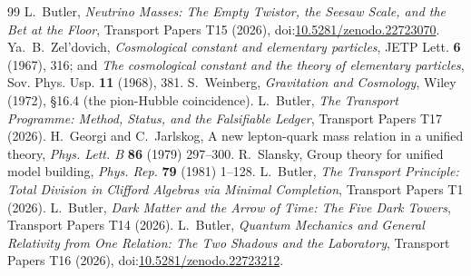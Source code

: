 \documentclass[11pt]{article}
\theoremstyle{definition}
\theoremstyle{plain}
\begin{document}
\begin{thebibliography}{99}
 L.~Butler,
\emph{Neutrino Masses: The Empty Twistor, the Seesaw Scale, and the Bet at the Floor},
Transport Papers T15 (2026), doi:\href{https://doi.org/10.5281/zenodo.22723070}{10.5281/zenodo.22723070}.
 Ya.~B.~Zel'dovich,
\emph{Cosmological constant and elementary particles},
JETP Lett. \textbf{6} (1967), 316; and \emph{The cosmological constant and the theory of elementary particles}, Sov. Phys. Usp. \textbf{11} (1968), 381.
 S.~Weinberg,
\emph{Gravitation and Cosmology},
Wiley (1972), \S16.4 (the pion-Hubble coincidence).
 L.~Butler,
\emph{The Transport Programme: Method, Status, and the Falsifiable Ledger},
Transport Papers T17 (2026).
 H.~Georgi and C.~Jarlskog,
A new lepton-quark mass relation in a unified theory,
\emph{Phys. Lett. B} \textbf{86} (1979) 297--300.
 R.~Slansky,
Group theory for unified model building,
\emph{Phys. Rep.} \textbf{79} (1981) 1--128.
 L.~Butler,
\emph{The Transport Principle: Total Division in Clifford Algebras via Minimal Completion},
Transport Papers T1 (2026).
 L.~Butler,
\emph{Dark Matter and the Arrow of Time: The Five Dark Towers},
Transport Papers T14 (2026).
 L.~Butler,
\emph{Quantum Mechanics and General Relativity from One Relation: The Two Shadows and the Laboratory},
Transport Papers T16 (2026), doi:\href{https://doi.org/10.5281/zenodo.22723212}{10.5281/zenodo.22723212}.
\end{thebibliography}
\end{document}
